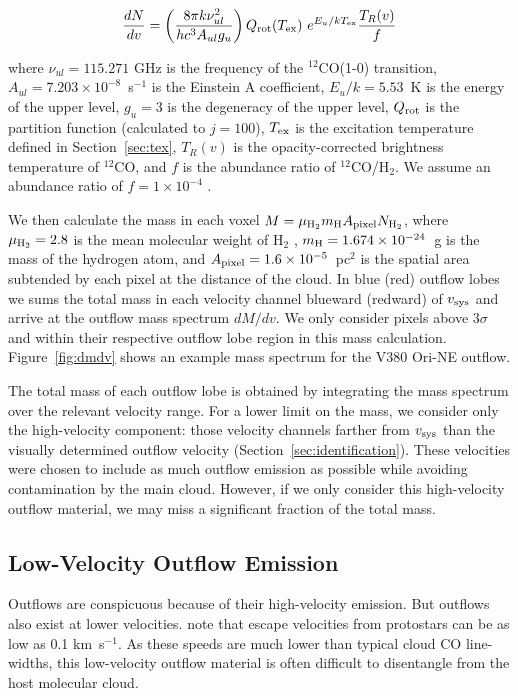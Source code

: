 \documentclass[twocolumn]{aastex62}
\newcommand{\example}{V380 Ori-NE}
\newcommand{\kms}{km~s$^{-1}$}
\newcommand{\co}[1][]{\ensuremath{^{#1}}CO}
\begin{document}
\begin{equation}\label{eq:dNdv}
\frac{dN}{dv} = \left(\frac{8\pi k \nu^2_{ul}}{h c^3 A_{ul} g_u}\right) Q_{\rm rot}(T_{\rm ex})~ e^{E_u / kT_{\rm ex}} \frac{T_R(v)}{f}
\end{equation}

where $\nu_{ul} = 115.271$ GHz is the frequency of the \co[12](1-0) transition, $A_{ul} = 7.203 \times 10^{-8}$~s$^{-1}$ is the Einstein A coefficient, $E_u/k = 5.53$~K is the energy of the upper level, $g_u = 3$ is the degeneracy of the upper level, $Q_{\rm rot}$ is the partition function (calculated to $j=100$), $T_{\rm ex}$ is the excitation temperature defined in Section~\ref{sec:tex}, $T_R(v)$ is the opacity-corrected brightness temperature of \co[12]{}, and $f$ is the abundance ratio of 
\co[12]/H$_{2}$. We assume an abundance ratio of $f = 1 \times 10 ^{-4}$ \citep{Frerking82}.

We then calculate the mass in each voxel $M = \mu_{\rm H_2} m_{\rm H} A_{\rm pixel} N_{\rm H_2}$, where $\mu_{\rm H_2} = 2.8$ is the mean molecular weight of H$_2$ \citep{Kauffmann08}, $m_{\rm H} = 1.674 \times 10^{-24}$~g is the mass of the hydrogen atom, and $A_{\rm pixel} = 1.6 \times 10^{-5}$~pc$^2$ is the spatial area subtended by each pixel at the distance of the cloud. In blue (red) outflow lobes we sums the total mass in each velocity channel blueward (redward) of $v_{\rm sys}$ and arrive at the outflow mass spectrum $dM/dv$. We only consider pixels above $3\sigma$ and within their respective outflow lobe region in this mass calculation. Figure~\ref{fig:dmdv} shows an example mass spectrum for the \example{} outflow.

The total mass of each outflow lobe is obtained by integrating the mass spectrum over the relevant velocity range. For a lower limit on the mass, we consider only the high-velocity component: those velocity channels farther from $v_{\rm sys}$ than the visually determined outflow velocity (Section~\ref{sec:identification}). These velocities were chosen to include as much outflow emission as possible while avoiding contamination by the main cloud. However, if we only consider this high-velocity outflow material, we may miss a significant fraction of the total mass.

\subsection{Low-Velocity Outflow Emission}
Outflows are conspicuous because of their high-velocity emission. But outflows also exist at lower velocities. \citet{Dunham14} note that escape velocities from protostars can be as low as 0.1 \kms. As these speeds are much lower than typical cloud CO line-widths, this low-velocity outflow material is often difficult to disentangle from the host molecular cloud.
\end{document}
